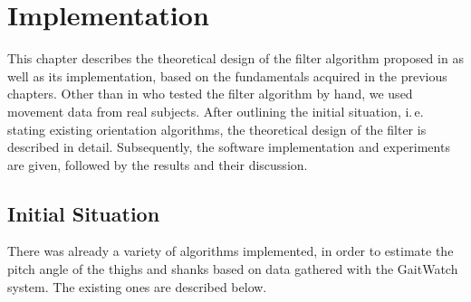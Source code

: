 \chapter{Implementation}
\label{ch:Implementation}

This chapter describes the theoretical design of the filter algorithm proposed in \cite{bennett_motion_2014} as well as its implementation, based on the fundamentals acquired in the previous chapters. Other than \citeauthor{bennett_motion_2014} in \cite{bennett_motion_2014} who tested the filter algorithm by hand, we used movement data from real subjects. After outlining the initial situation, i.\,e. stating existing orientation algorithms, the theoretical design of the filter is described in detail. Subsequently, the software implementation and experiments are given, followed by the results and their discussion.

\section{Initial Situation}

There was already a variety of algorithms implemented, in order to estimate the pitch angle of the thighs and shanks based on data gathered with the GaitWatch system. The existing ones are described below.

